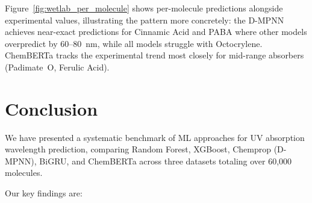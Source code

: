 \documentclass[journal=jcisd8,manuscript=article]{achemso}
\begin{document}
Figure~\ref{fig:wetlab_per_molecule} shows per-molecule predictions alongside experimental values, illustrating the pattern more concretely: the D-MPNN achieves near-exact predictions for Cinnamic Acid and PABA where other models overpredict by 60--80~nm, while all models struggle with Octocrylene. ChemBERTa tracks the experimental trend most closely for mid-range absorbers (Padimate~O, Ferulic Acid).

\FloatBarrier

\section{Conclusion}
\label{sec:conclusion}

We have presented a systematic benchmark of ML approaches for UV absorption wavelength prediction, comparing Random Forest, XGBoost, Chemprop (D-MPNN), BiGRU, and ChemBERTa across three datasets totaling over 60,000 molecules.

Our key findings are:
\end{document}
